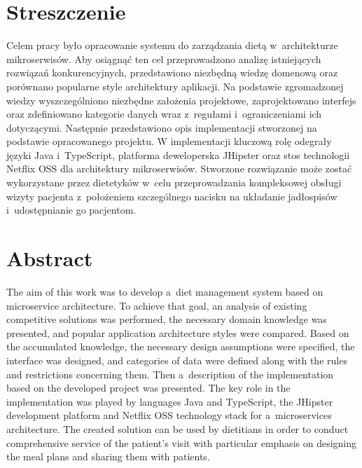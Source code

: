 \chapter*{Streszczenie} %
Celem pracy było opracowanie systemu do zarządzania dietą w~architekturze mikroserwisów.
Aby osiągnąć ten cel przeprowadzono analizę istniejących rozwiązań konkurencyjnych, przedstawiono niezbędną wiedzę domenową oraz porównano popularne style architektury aplikacji.
Na podstawie zgromadzonej wiedzy wyszczególniono niezbędne założenia projektowe, zaprojektowano interfejs oraz zdefiniowano kategorie danych wraz z~regułami i~ograniczeniami ich dotyczącymi.
Następnie przedstawiono opis implementacji stworzonej na podstawie opracowanego projektu.
W implementacji kluczową rolę odegrały języki Java i~TypeScript, platforma deweloperska JHipster oraz stos technologii Netflix OSS dla architektury mikroserwisów.
Stworzone rozwiązanie może zostać wykorzystane przez dietetyków w~celu przeprowadzania kompleksowej obsługi wizyty pacjenta z~położeniem szczególnego nacisku na układanie jadłospisów i~udostępnianie go pacjentom.


\begingroup
\renewcommand{\cleardoublepage}{}
\renewcommand{\clearpage}{}
\chapter*{Abstract} %
The aim of this work was to develop a~diet management system based on microservice architecture.
To achieve that goal, an analysis of existing competitive solutions was performed, the necessary domain knowledge was presented, and popular application architecture styles were compared.
Based on the accumulated knowledge, the necessary design assumptions were specified, the interface was designed, and categories of data were defined along with the rules and restrictions concerning them.
Then a~description of the implementation based on the developed project was presented.
The key role in the implementation was played by languages Java and TypeScript, the JHipster development platform and Netflix OSS technology stack for a~microservices architecture.
The created solution can be used by dietitians in order to conduct comprehensive service of the patient's visit with particular emphasis on designing the meal plans and sharing them with patients.
\endgroup
{}
